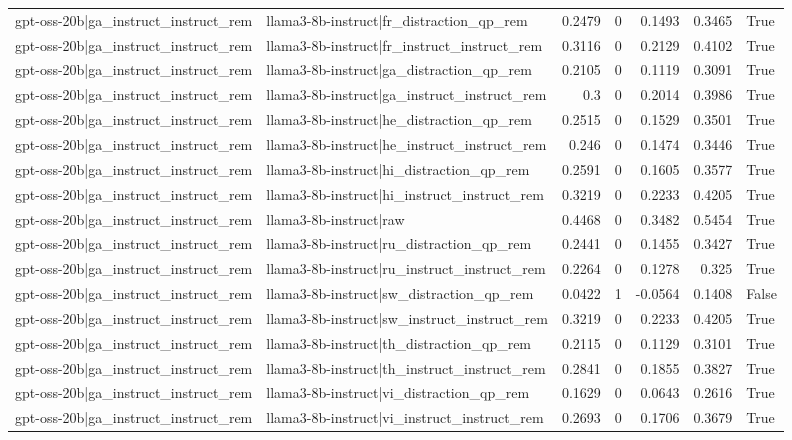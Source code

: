 \begin{table}
\begin{tabular}{l l r r r r l}
gpt-oss-20b|ga_instruct_instruct_rem & llama3-8b-instruct|fr_distraction_qp_rem & 0.2479 & 0 & 0.1493 & 0.3465 & True \\
gpt-oss-20b|ga_instruct_instruct_rem & llama3-8b-instruct|fr_instruct_instruct_rem & 0.3116 & 0 & 0.2129 & 0.4102 & True \\
gpt-oss-20b|ga_instruct_instruct_rem & llama3-8b-instruct|ga_distraction_qp_rem & 0.2105 & 0 & 0.1119 & 0.3091 & True \\
gpt-oss-20b|ga_instruct_instruct_rem & llama3-8b-instruct|ga_instruct_instruct_rem & 0.3 & 0 & 0.2014 & 0.3986 & True \\
gpt-oss-20b|ga_instruct_instruct_rem & llama3-8b-instruct|he_distraction_qp_rem & 0.2515 & 0 & 0.1529 & 0.3501 & True \\
gpt-oss-20b|ga_instruct_instruct_rem & llama3-8b-instruct|he_instruct_instruct_rem & 0.246 & 0 & 0.1474 & 0.3446 & True \\
gpt-oss-20b|ga_instruct_instruct_rem & llama3-8b-instruct|hi_distraction_qp_rem & 0.2591 & 0 & 0.1605 & 0.3577 & True \\
gpt-oss-20b|ga_instruct_instruct_rem & llama3-8b-instruct|hi_instruct_instruct_rem & 0.3219 & 0 & 0.2233 & 0.4205 & True \\
gpt-oss-20b|ga_instruct_instruct_rem & llama3-8b-instruct|raw & 0.4468 & 0 & 0.3482 & 0.5454 & True \\
gpt-oss-20b|ga_instruct_instruct_rem & llama3-8b-instruct|ru_distraction_qp_rem & 0.2441 & 0 & 0.1455 & 0.3427 & True \\
gpt-oss-20b|ga_instruct_instruct_rem & llama3-8b-instruct|ru_instruct_instruct_rem & 0.2264 & 0 & 0.1278 & 0.325 & True \\
gpt-oss-20b|ga_instruct_instruct_rem & llama3-8b-instruct|sw_distraction_qp_rem & 0.0422 & 1 & -0.0564 & 0.1408 & False \\
gpt-oss-20b|ga_instruct_instruct_rem & llama3-8b-instruct|sw_instruct_instruct_rem & 0.3219 & 0 & 0.2233 & 0.4205 & True \\
gpt-oss-20b|ga_instruct_instruct_rem & llama3-8b-instruct|th_distraction_qp_rem & 0.2115 & 0 & 0.1129 & 0.3101 & True \\
gpt-oss-20b|ga_instruct_instruct_rem & llama3-8b-instruct|th_instruct_instruct_rem & 0.2841 & 0 & 0.1855 & 0.3827 & True \\
gpt-oss-20b|ga_instruct_instruct_rem & llama3-8b-instruct|vi_distraction_qp_rem & 0.1629 & 0 & 0.0643 & 0.2616 & True \\
gpt-oss-20b|ga_instruct_instruct_rem & llama3-8b-instruct|vi_instruct_instruct_rem & 0.2693 & 0 & 0.1706 & 0.3679 & True \\

\end{tabular}
\end{table}
